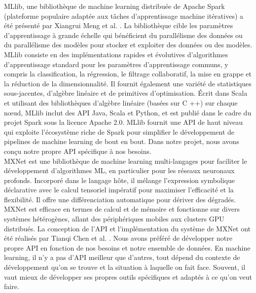\documentclass[12pt, french]{report}
\begin{document}
MLlib, une bibliothèque de machine learning distribuée de Apache Spark (plateforme populaire adaptée aux tâches d'apprentissage machine itératives) a été présenté par Xiangrui Meng et al. \cite{key34}. La bibliothèque cible les paramètres d'apprentissage à grande échelle qui bénéficient du parallélisme des données ou du parallélisme des modèles pour stocker et exploiter des données ou des modèles. MLlib consiste en des implémentations rapides et évolutives d'algorithmes d'apprentissage standard pour les paramètres d'apprentissage communs, y compris la classification, la régression, le filtrage collaboratif, la mise en grappe et la réduction de la dimensionnalité. Il fournit également une variété de statistiques sous-jacentes, d'algèbre linéaire et de primitives d'optimisation. Écrit dans Scala et utilisant des bibliothèques d'algèbre linéaire (basées sur C ++) sur chaque nœud, MLlib inclut des API Java, Scala et Python, et est publié dans le cadre du projet Spark sous la licence Apache 2.0. MLlib  fournit une API de haut niveau qui exploite l'écosystème riche de Spark pour simplifier le développement de pipelines de machine learning de bout en bout. Dans notre projet, nous avons conçu notre propre API spécifique à nos besoins. \\

MXNet est une bibliothèque de machine learning multi-langages pour faciliter le développement d'algorithmes ML, en particulier pour les réseaux neuronaux profonds. Incorporé dans le langage hôte, il mélange l'expression symbolique déclarative avec le calcul tensoriel impératif pour maximiser l'efficacité et la flexibilité. Il offre une différenciation automatique pour dériver des dégradés. MXNet est efficace en termes de calcul et de mémoire et fonctionne sur divers systèmes hétérogènes, allant des périphériques mobiles aux clusters GPU distribués. La conception de l'API et l'implémentation du système de MXNet ont été réalisés par Tianqi Chen et al. \cite{key35}. Nous avons préféré de développer notre propre API en fonction de nos besoins et notre ensemble de données. En machine learning, il n'y a pas d'API meilleur que d'autres, tout dépend du contexte de développement qu'on se trouve et la situation à laquelle on fait face. Souvent, il vaut mieux de développer ses propres outils spécifiques et adaptés à ce qu'on veut faire. \\
\end{document}
